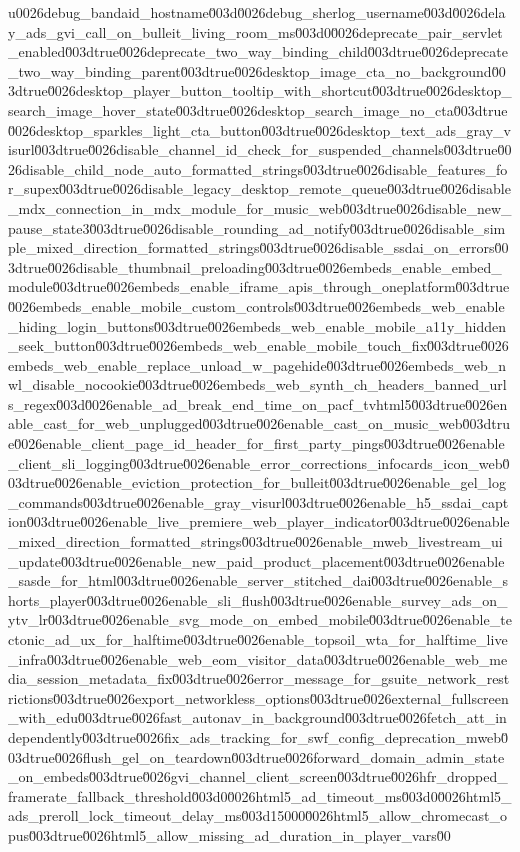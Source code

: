 {u0026debug_bandaid_hostname\u003d\u0026debug_sherlog_username\u003d\u0026delay_ads_gvi_call_on_bulleit_living_room_ms\u003d0\u0026deprecate_pair_servlet_enabled\u003dtrue\u0026deprecate_two_way_binding_child\u003dtrue\u0026deprecate_two_way_binding_parent\u003dtrue\u0026desktop_image_cta_no_background\u003dtrue\u0026desktop_player_button_tooltip_with_shortcut\u003dtrue\u0026desktop_search_image_hover_state\u003dtrue\u0026desktop_search_image_no_cta\u003dtrue\u0026desktop_sparkles_light_cta_button\u003dtrue\u0026desktop_text_ads_gray_visurl\u003dtrue\u0026disable_channel_id_check_for_suspended_channels\u003dtrue\u0026disable_child_node_auto_formatted_strings\u003dtrue\u0026disable_features_for_supex\u003dtrue\u0026disable_legacy_desktop_remote_queue\u003dtrue\u0026disable_mdx_connection_in_mdx_module_for_music_web\u003dtrue\u0026disable_new_pause_state3\u003dtrue\u0026disable_rounding_ad_notify\u003dtrue\u0026disable_simple_mixed_direction_formatted_strings\u003dtrue\u0026disable_ssdai_on_errors\u003dtrue\u0026disable_thumbnail_preloading\u003dtrue\u0026embeds_enable_embed_module\u003dtrue\u0026embeds_enable_iframe_apis_through_oneplatform\u003dtrue\u0026embeds_enable_mobile_custom_controls\u003dtrue\u0026embeds_web_enable_hiding_login_buttons\u003dtrue\u0026embeds_web_enable_mobile_a11y_hidden_seek_button\u003dtrue\u0026embeds_web_enable_mobile_touch_fix\u003dtrue\u0026embeds_web_enable_replace_unload_w_pagehide\u003dtrue\u0026embeds_web_nwl_disable_nocookie\u003dtrue\u0026embeds_web_synth_ch_headers_banned_urls_regex\u003d\u0026enable_ad_break_end_time_on_pacf_tvhtml5\u003dtrue\u0026enable_cast_for_web_unplugged\u003dtrue\u0026enable_cast_on_music_web\u003dtrue\u0026enable_client_page_id_header_for_first_party_pings\u003dtrue\u0026enable_client_sli_logging\u003dtrue\u0026enable_error_corrections_infocards_icon_web\u003dtrue\u0026enable_eviction_protection_for_bulleit\u003dtrue\u0026enable_gel_log_commands\u003dtrue\u0026enable_gray_visurl\u003dtrue\u0026enable_h5_ssdai_caption\u003dtrue\u0026enable_live_premiere_web_player_indicator\u003dtrue\u0026enable_mixed_direction_formatted_strings\u003dtrue\u0026enable_mweb_livestream_ui_update\u003dtrue\u0026enable_new_paid_product_placement\u003dtrue\u0026enable_sasde_for_html\u003dtrue\u0026enable_server_stitched_dai\u003dtrue\u0026enable_shorts_player\u003dtrue\u0026enable_sli_flush\u003dtrue\u0026enable_survey_ads_on_ytv_lr\u003dtrue\u0026enable_svg_mode_on_embed_mobile\u003dtrue\u0026enable_tectonic_ad_ux_for_halftime\u003dtrue\u0026enable_topsoil_wta_for_halftime_live_infra\u003dtrue\u0026enable_web_eom_visitor_data\u003dtrue\u0026enable_web_media_session_metadata_fix\u003dtrue\u0026error_message_for_gsuite_network_restrictions\u003dtrue\u0026export_networkless_options\u003dtrue\u0026external_fullscreen_with_edu\u003dtrue\u0026fast_autonav_in_background\u003dtrue\u0026fetch_att_independently\u003dtrue\u0026fix_ads_tracking_for_swf_config_deprecation_mweb\u003dtrue\u0026flush_gel_on_teardown\u003dtrue\u0026forward_domain_admin_state_on_embeds\u003dtrue\u0026gvi_channel_client_screen\u003dtrue\u0026hfr_dropped_framerate_fallback_threshold\u003d0\u0026html5_ad_timeout_ms\u003d0\u0026html5_ads_preroll_lock_timeout_delay_ms\u003d15000\u0026html5_allow_chromecast_opus\u003dtrue\u0026html5_allow_missing_ad_duration_in_player_vars\u00}
